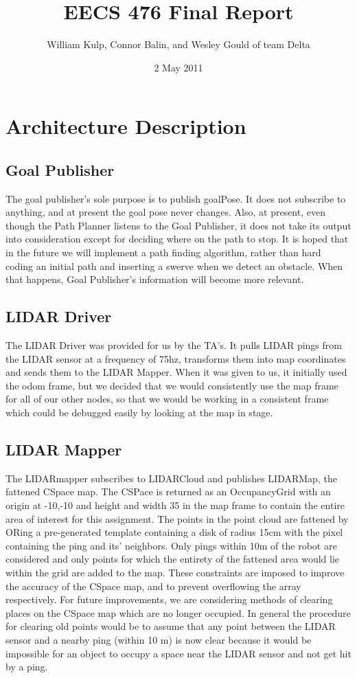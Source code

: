 \documentclass{article}
\author{William Kulp, Connor Balin, and Wesley Gould of team Delta}
\title{EECS 476 Final Report}
\date{2 May 2011}
\begin{document}
\maketitle

\small
\section{Architecture Description}

\subsection{Goal Publisher}

The goal publisher's sole purpose is to publish goalPose.
It does not subscribe to anything, and at present the goal pose never changes.
Also, at present, even though the Path Planner listens to the Goal Publisher, it does not take its output into consideration except for deciding where on the path to stop.
It is hoped that in the future we will implement a path finding algorithm, rather than hard coding an initial path and inserting a swerve when we detect an obstacle.
When that happens, Goal Publisher's information will become more relevant.


\subsection{LIDAR Driver}

The LIDAR Driver was provided for us by the TA's.
It pulls LIDAR pings from the LIDAR sensor at a frequency of 75hz, transforms them into map coordinates and sends them to the LIDAR Mapper.
When it was given to us, it initially used the odom frame, but we decided that we would consistently use the map frame for all of our other nodes, so that we would be working in a consistent frame which could be debugged easily by looking at the map in stage.


\subsection{LIDAR Mapper}

The LIDARmapper subscribes to LIDARCloud and publishes LIDARMap, the fattened CSpace map.
The CSPace is returned as an OccupancyGrid with an origin at -10,-10 and height and width 35 in the map frame to contain the entire area of interest for this assignment.
The points in the point cloud are fattened by ORing a pre-generated template containing a disk of radius 15cm with the pixel containing the ping and its' neighbors.
Only pings within 10m of the robot are considered and only points for which the entirety of the fattened area would lie within the grid are added to the map.
These constraints are imposed to improve the accuracy of the CSpace map, and to prevent overflowing the array respectively.
For future improvements, we are considering methods of clearing places on the CSpace map which are no longer occupied.
In general the procedure for clearing old points would be to assume that any point between the LIDAR sensor and a nearby ping (within 10 m) is now clear because it would be impossible for an object to occupy a space near the LIDAR sensor and not get hit by a ping.
\end{document}
